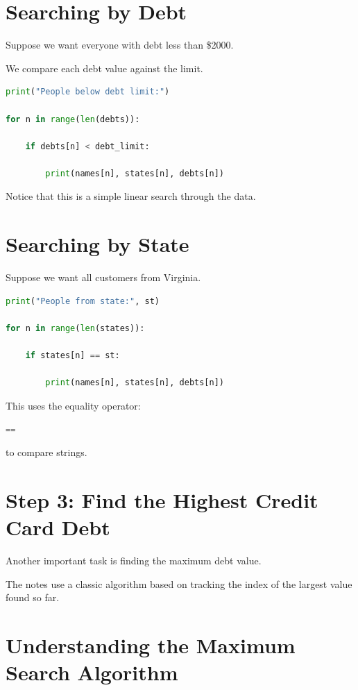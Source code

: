 \documentclass[11pt]{article}
\begin{document}
\section{Searching by Debt}

Suppose we want everyone with debt less than \$2000.

We compare each debt value against the limit.

\begin{lstlisting}[language=Python]
print("People below debt limit:")

for n in range(len(debts)):

    if debts[n] < debt_limit:

        print(names[n], states[n], debts[n])
\end{lstlisting}

Notice that this is a simple linear search through the data.

\section{Searching by State}

Suppose we want all customers from Virginia.

\begin{lstlisting}[language=Python]
print("People from state:", st)

for n in range(len(states)):

    if states[n] == st:

        print(names[n], states[n], debts[n])
\end{lstlisting}

This uses the equality operator:

\begin{lstlisting}[language=Python]
==
\end{lstlisting}

to compare strings.

\section{Step 3: Find the Highest Credit Card Debt}

Another important task is finding the maximum debt value.

The notes use a classic algorithm based on tracking the index of the largest value found so far.

\section{Understanding the Maximum Search Algorithm}
\end{document}
